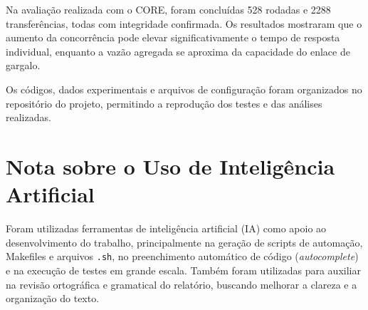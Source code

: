 \documentclass[12pt]{article}
\begin{document}
Na avaliação realizada com o CORE, foram concluídas 528 rodadas e 2288 transferências, todas com integridade confirmada. Os resultados mostraram que o aumento da concorrência pode elevar significativamente o tempo de resposta individual, enquanto a vazão agregada se aproxima da capacidade do enlace de gargalo.

Os códigos, dados experimentais e arquivos de configuração foram organizados no repositório do projeto, permitindo a reprodução dos testes e das análises realizadas.



\section*{Nota sobre o Uso de Inteligência Artificial}

Foram utilizadas ferramentas de inteligência artificial (IA) como apoio ao desenvolvimento do trabalho, principalmente na geração de scripts de automação, Makefiles e arquivos \texttt{.sh}, no preenchimento automático de código (\textit{autocomplete}) e na execução de testes em grande escala. Também foram utilizadas para auxiliar na revisão ortográfica e gramatical do relatório, buscando melhorar a clareza e a organização do texto.




\end{document}

